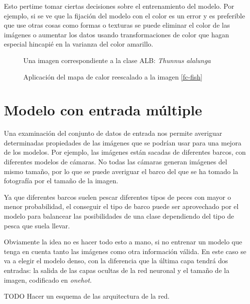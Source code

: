 Esto pertime tomar ciertas decisiones sobre el entrenamiento del modelo. Por ejemplo, si se ve que la fijación del modelo con el color es un error y es preferible que use otras cosas como formas o texturas se puede eliminar el color de las imágenes o aumentar los datos usando transformaciones de color que hagan especial hincapié en la varianza del color amarillo.

\begin{figure}
    \caption{Una imagen correspondiente a la clase ALB: \textit{Thunnus alalunga}}
\label{yft}
\end{figure}

\begin{figure}
    \caption{Aplicación del mapa de calor reescalado a la imagen \ref{fc-fish}}
\label{yft-heatmap}
\end{figure}

\section{Modelo con entrada múltiple}

Una examinación del conjunto de datos de entrada nos permite averiguar determinadas propiedades de las imágenes que se podrían usar para una mejora de los modelos. Por ejemplo, las imágenes están sacadas de diferentes barcos, con diferentes modelos de cámaras. No todas las cámaras generan imágenes del mismo tamaño, por lo que se puede averiguar el barco del que se ha tomado la fotografía por el tamaño de la imagen. 

Ya que diferentes barcos suelen pescar diferentes tipos de peces con mayor o menor probabilidad, el conseguir el tipo de barco puede ser aprovechado por el modelo para balancear las posibilidades de una clase dependiendo del tipo de pesca que suela llevar.

Obviamente la idea no es hacer todo esto a mano, si no entrenar un modelo que tenga en cuenta tanto las imágenes como otra información válida. En este caso se va a elegir el modelo denso, con la diferencia que la última capa tendrá dos entradas: la salida de las capas ocultas de la red neuronal y el tamaño de la imagen, codificado en \textit{onehot}.

TODO Hacer un esquema de las arquitectura de la red.

